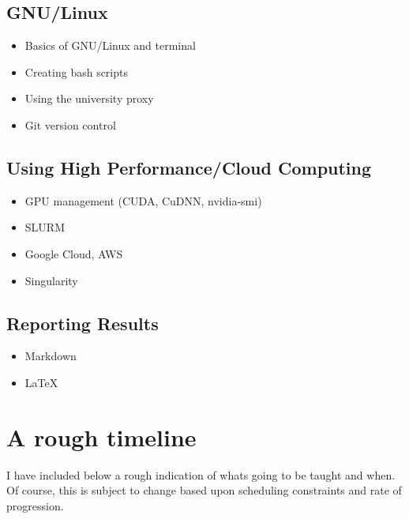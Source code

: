 \documentclass[11pt]{article}
\begin{document}
\subsection{GNU/Linux}
\label{sec:org69b314b}
\begin{itemize}
\item Basics of GNU/Linux and terminal
\item Creating bash scripts
\item Using the university proxy
\item Git version control
\end{itemize}
\subsection{Using High Performance/Cloud Computing}
\label{sec:org9da0355}
\begin{itemize}
\item GPU management (CUDA, CuDNN, nvidia-smi)
\item SLURM
\item Google Cloud, AWS
\item Singularity
\end{itemize}
\subsection{Reporting Results}
\label{sec:orga63b3de}
\begin{itemize}
\item Markdown
\item \LaTeX{}
\end{itemize}

\section{A rough timeline}
\label{sec:orgdbab9eb}

I have included below a rough indication of whats going to be taught and when. Of
course, this is subject to change based upon scheduling constraints and rate of
progression.
\end{document}
